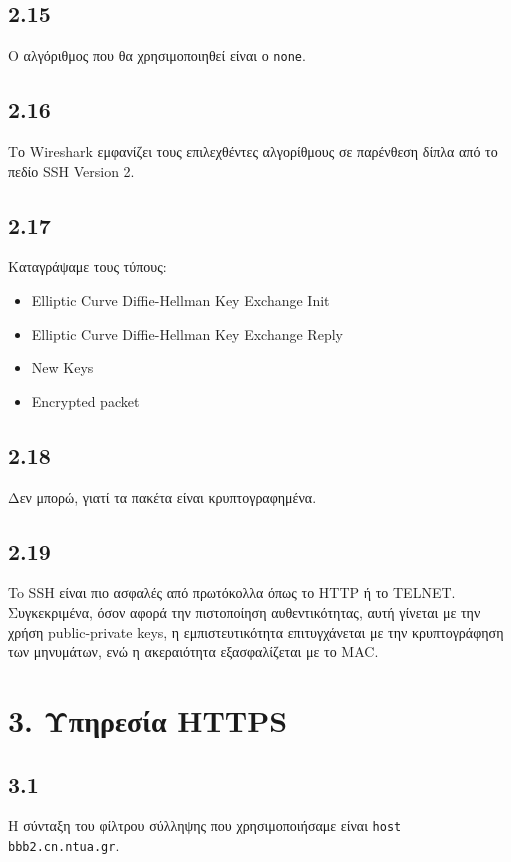 		\subsection*{2.15}
			Ο αλγόριθμος που θα χρησιμοποιηθεί είναι ο \verb|none|.
	
		\subsection*{2.16}
			Το Wireshark εμφανίζει τους επιλεχθέντες αλγορίθμους σε παρένθεση δίπλα από το πεδίο SSH Version 2.
	
		\subsection*{2.17}
			Καταγράψαμε τους τύπους:
			
			\begin{itemize}
				\item Elliptic Curve Diffie-Hellman Key Exchange Init
				\item Elliptic Curve Diffie-Hellman Key Exchange Reply
				\item New Keys
				\item Encrypted packet
			\end{itemize}
	
		\subsection*{2.18}
			Δεν μπορώ, γιατί τα πακέτα είναι κρυπτογραφημένα.
	
		\subsection*{2.19}
			To SSH είναι πιο ασφαλές από πρωτόκολλα όπως το HTTP ή το TELNET. Συγκεκριμένα, όσον αφορά την πιστοποίηση αυθεντικότητας, αυτή γίνεται με την χρήση public-private keys, η εμπιστευτικότητα επιτυγχάνεται με την κρυπτογράφηση των μηνυμάτων, ενώ η ακεραιότητα εξασφαλίζεται με το MAC.
	
		
	\section*{3. Υπηρεσία HTTPS}

		\subsection*{3.1}
			Η σύνταξη του φίλτρου σύλληψης που χρησιμοποιήσαμε είναι \verb|host bbb2.cn.ntua.gr|.

